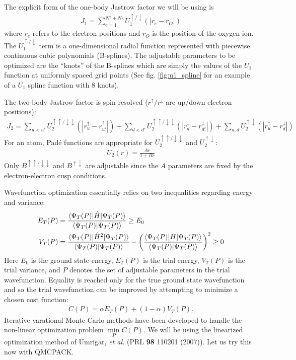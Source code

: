 {The explicit form of the one-body Jastrow factor we will be using is
\begin{align}\label{eq:J1}
  J_1 = \sum_{e=1}^{N^\uparrow+N^\downarrow}U_1^{\uparrow/\downarrow}(|r_e-r_O|)
\end{align}
where $r_e$ refers to the electron positions and $r_O$ is 
the position of the oxygen ion.  The $U_1^{\uparrow/\downarrow}$ term is a 
one-dimensional radial function represented with piecewise continuous cubic 
polynomials (B-splines).  The adjustable parameters to be optimized are the 
``knots'' of the B-splines which are simply the values of the $U_1$ function at 
uniformly spaced grid points (See fig. \ref{fig:u1_spline} for an example of a $U_1$ 
spline function with 8 knots).  

The two-body Jastrow factor is spin resolved ($r^\uparrow/r^\downarrow$ are up/down electron positions):
\begin{align}\label{eq:J2}
  J_2 = \sum_{u<u'}U_2^{\uparrow\uparrow/\downarrow\downarrow}(|r_u^\uparrow-r_{u'}^\uparrow|) + \sum_{d<d'}U_2^{\uparrow\uparrow/\downarrow\downarrow}(|r_d^\downarrow-r_{d'}^\downarrow|) + \sum_{u,d} U_2^{\uparrow\downarrow}(|r_u^\uparrow-r_d^\downarrow|)
\end{align}
For an atom, Pad\'{e} functions are appropriate for $U_2^{\uparrow\uparrow/\downarrow\downarrow}$ and $U_2^{\uparrow\downarrow}$:
\begin{align}
  U_2(r) = \frac{Ar}{1+Br}
\end{align}
Only $B^{\uparrow\uparrow/\downarrow\downarrow}$ and $B^{\uparrow\downarrow}$ are adjustable since the $A$ parameters are fixed by the electron-electron cusp conditions.

Wavefunction optimization essentially relies on two inequalities regarding energy and variance:
\begin{align}
  E_T(P) &= \frac{\expvalh{\Psi_T(P)}{H}{\Psi_T(P)}}{\overlap{\Psi_T(P)}{\Psi_T(P)}} \ge E_0 \\
  V_T(P) &= \frac{\expval{\Psi_T(P)}{\hat{H}^2}{\Psi_T(P)}}{\overlap{\Psi_T(P)}{\Psi_T(P)}} - \left(\frac{\expval{\Psi_T(P)}{H}{\Psi_T(P)}}{\overlap{\Psi_T(P)}{\Psi_T(P)}}\right)^2 \ge 0   
\end{align}
Here $E_0$ is the ground state energy, $E_T(P)$ is the trial energy, $V_T(P)$ is the trial variance, and $P$ denotes the set of adjustable parameters in the trial wavefunction.  Equality is reached only for the true ground state wavefunction and so the trial wavefunction can be improved by attempting to minimize a chosen cost function: 
\begin{align}
  C(P) = \alpha E_T(P) + (1-\alpha) V_T(P).
\end{align}  
Iterative varational Monte Carlo methods have been developed to handle the non-linear optimization problem $\min\limits_P C(P)$.  We will be using the linearized optimization method of Umrigar, \emph{et al.} (PRL \textbf{98} 110201 (2007)).  Let us try this now with QMCPACK.
}


